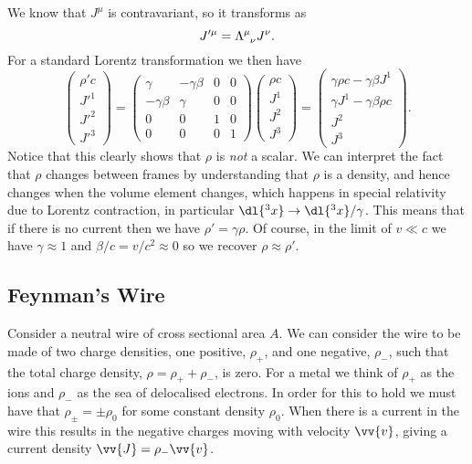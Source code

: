We know that \(J^\mu\) is contravariant, so it transforms as
\begin{equation}
    J'^\mu = \tensor{\Lambda}{^\mu_\nu} J^\nu.
\end{equation}
For a standard Lorentz transformation we then have
\begin{equation}
    \begin{pmatrix}
        \rho' c\\ J'^1\\ J'^2\\ J'^3
    \end{pmatrix}
    =
    \begin{pmatrix}
        \gamma & -\gamma\beta & 0 & 0\\
        -\gamma\beta & \gamma & 0 & 0\\
        0 & 0 & 1 & 0\\
        0 & 0 & 0 & 1
    \end{pmatrix}
    \begin{pmatrix}
        \rho c\\ J^1\\ J^2\\ J^3
    \end{pmatrix}
    =
    \begin{pmatrix}
        \gamma\rho c - \gamma\beta J^1\\
        \gamma J^1 - \gamma\beta \rho c\\
        J^2\\
        J^3
    \end{pmatrix}
    .
\end{equation}
Notice that this clearly shows that \(\rho\) is \emph{not} a scalar.
We can interpret the fact that \(\rho\) changes between frames by understanding that \(\rho\) is a density, and hence changes when the volume element changes, which happens in special relativity due to Lorentz contraction, in particular \(\dl{^3x} \to \dl{^3x}/\gamma\).
This means that if there is no current then we have \(\rho' = \gamma \rho\).
Of course, in the limit of \(v \ll c\) we have \(\gamma \approx 1\) and \(\beta/c = v/c^2 \approx 0\) so we recover \(\rho \approx \rho'\).

\subsection{Feynman's Wire}
Consider a neutral wire of cross sectional area \(A\).
We can consider the wire to be made of two charge densities, one positive, \(\rho_+\), and one negative, \(\rho_-\), such that the total charge density, \(\rho = \rho_+ + \rho_-\), is zero.
For a metal we think of \(\rho_+\) as the ions and \(\rho_-\) as the sea of delocalised electrons.
In order for this to hold we must have that \(\rho_{\pm} = \pm \rho_0\) for some constant density \(\rho_0\).
When there is a current in the wire this results in the negative charges moving with velocity \(\vv{v}\), giving a current density \(\vv{J} = \rho_-\vv{v}\).

